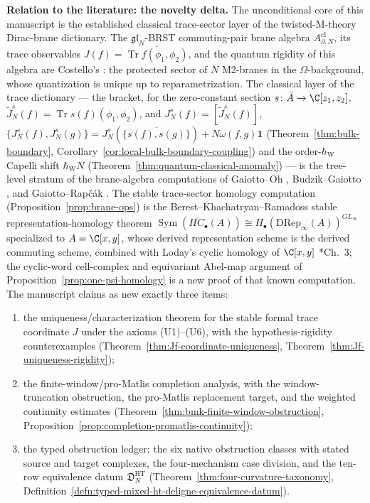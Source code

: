 \documentclass[11pt]{memoir}
\begin{document}
  \medskip\noindent
  \textbf{Relation to the literature: the novelty delta.}
  The unconditional core of this manuscript is the established
  classical trace-sector layer of the twisted-M-theory Dirac-brane
  dictionary.  The \(\mathfrak{gl}_N\)-BRST
  commuting-pair brane algebra
  \(A^{\mathrm{cl}}_{\partial,N}\), its trace observables
  \(J(f)=\overline{\operatorname{Tr}f(\phi_1,\phi_2)}\), and the
  quantum rigidity of this algebra are Costello's
  \cite{costello-twistedM}\cite{costello-m2-koszul}: the protected
  sector of \(N\) M2-branes in the \(\Omega\)-background, whose
  quantization is unique up to reparametrization.  The classical layer
  of the trace dictionary --- the bracket, for the zero-constant section
  \(s\colon\bar A\to\C[z_1,z_2]\),
  \(\widetilde J_N^s(f)=\operatorname{Tr}s(f)(\phi_1,\phi_2)\), and
  \(J_N^s(f)=[\widetilde J_N^s(f)]\),
  \(\{J_N^s(f),J_N^s(g)\}
    =J_N^s(\overline{\{s(f),s(g)\}})+N\omega(f,g)\mathbf1\)
  (Theorem~\ref{thm:bulk-boundary},
  Corollary~\ref{cor:local-bulk-boundary-coupling}) and the
  order-\(\hbar_{\mathrm{W}}\) Capelli shift \(\hbar_{\mathrm{W}}N\)
  (Theorem~\ref{thm:quantum-classical-anomaly}) --- is the tree-level
  stratum of the brane-algebra computations of Gaiotto--Oh
  \cite{gaiotto-oh-omega}, Budzik--Gaiotto
  \cite{budzik-gaiotto-twisted-holography}, and Gaiotto--Rap\v{c}\'ak
  \cite{gaiotto-rapcak-miura}.  The stable trace-sector homology
  computation (Proposition~\ref{prop:brane-ops}) is the
  Berest--Khachatryan--Ramadoss stable representation-homology theorem
  \(\operatorname{Sym}(\overline{HC}_\bullet(A))\cong
    H_\bullet(\mathrm{DRep}_\infty(A))^{GL_\infty}\)
  \cite{berest-khachatryan-ramadoss} specialized to \(A=\C[x,y]\),
  whose derived representation scheme is the derived commuting scheme,
  combined with Loday's cyclic homology of \(\C[x,y]\)
  \cite{loday-cyclic-homology}*{Ch.~3}; the cyclic-word cell-complex
  and equivariant Abel-map argument of
  Proposition~\ref{prop:one-psi-homology} is a new proof of that known
  computation.  The manuscript claims as new exactly three items:
  \begin{enumerate}
    \item the uniqueness/characterization theorem for the stable
      formal trace coordinate \(J\) under the axioms
      \textup{(U1)}--\textup{(U6)}, with the hypothesis-rigidity
      counterexamples
      (Theorem~\ref{thm:Jf-coordinate-uniqueness},
      Theorem~\ref{thm:Jf-uniqueness-rigidity});
    \item the finite-window/pro-Matlis completion analysis, with the
      window-truncation obstruction, the pro-Matlis replacement
      target, and the weighted continuity estimates
      (Theorem~\ref{thm:bmk-finite-window-obstruction},
      Proposition~\ref{prop:completion-promatlis-continuity});
    \item the typed obstruction ledger: the six native obstruction
      classes with stated source and target complexes, the
      four-mechanism case division, and the ten-row equivalence datum
      \(\mathfrak D^{\mathrm{HT}}_N\)
      (Theorem~\ref{thm:four-curvature-taxonomy},
      Definition~\ref{defn:typed-mixed-ht-deligne-equivalence-datum}).
  \end{enumerate}
\end{document}
